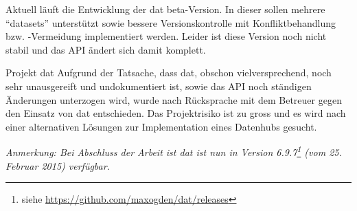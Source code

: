 Aktuell läuft die Entwicklung der \gls{dat} beta-Version. In dieser sollen mehrere ``datasets'' unterstützt sowie bessere Versionskontrolle mit Konfliktbehandlung bzw. -Vermeidung implementiert werden. Leider ist diese Version noch nicht stabil und das API ändert sich damit komplett.

\begin{decision}[label=dec:dat:fazit]{Projekt dat}
Aufgrund der Tatsache, dass \gls{dat}, obschon vielversprechend, noch sehr unausgereift und undokumentiert ist, sowie das API noch ständigen Änderungen unterzogen wird, wurde nach Rücksprache mit dem Betreuer gegen den Einsatz von \gls{dat} entschieden. Das Projektrisiko ist zu gross und es wird nach einer alternativen Lösungen zur Implementation eines Datenhubs gesucht.
\end{decision}

\textit{Anmerkung: Bei Abschluss der Arbeit ist \gls{dat} ist nun in Version 6.9.7\footnote{siehe \url{https://github.com/maxogden/dat/releases}} (vom 25. Februar 2015) verfügbar.}